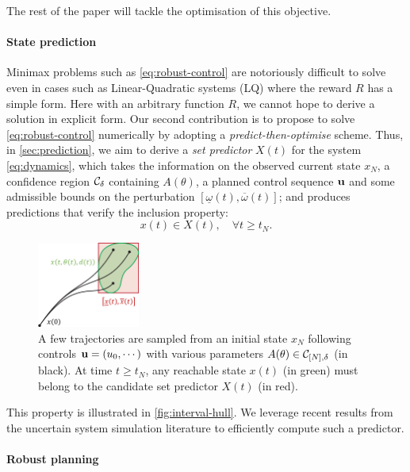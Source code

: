 \documentclass{article}
\begin{document}
The rest of the paper will tackle the optimisation of this objective.

\paragraph{State prediction}

Minimax problems such as \eqref{eq:robust-control} are notoriously difficult to solve even in cases such as Linear-Quadratic systems (LQ) where the reward $R$ has a simple form. Here with an arbitrary function $R$, we cannot hope to derive a solution in explicit form. Our second contribution is to propose to solve \eqref{eq:robust-control} numerically by adopting a \emph{predict-then-optimise} scheme. Thus, in \autoref{sec:prediction}, we aim to derive a \emph{set predictor} $X(t)$ for the system \eqref{eq:dynamics}, which takes the information on the observed current state ${x}_N$, a confidence region $\mathcal{C}_\delta$ containing $A(\theta)$, a planned control sequence $\mathbf{u}$ and some admissible bounds on the perturbation $[\underline{\omega}(t),\overline{\omega}(t)]$; and produces predictions that verify the inclusion property:
\begin{equation}
 x(t)\in X(t),\quad\forall t\geq t_N.
\end{equation}

\begin{figure}
    \centering
    \includegraphics[width=0.3\textwidth]{img/interval-hull}
    \caption{A few trajectories are sampled from an initial state $x_N$ following controls $\mathbf{u}=(u_0,\cdots)$ with various parameters $A(\theta)\in\mathcal{C}_{[N],\delta}$ (in black). At time $t\geq t_N$, any reachable state $x(t)$ (in green) must belong to the candidate set predictor $X(t)$ (in red).}
    \label{fig:interval-hull}
\end{figure}

This property is illustrated in \autoref{fig:interval-hull}. We leverage recent results from the uncertain system simulation literature to efficiently compute such a predictor.

\paragraph{Robust planning}
\end{document}
